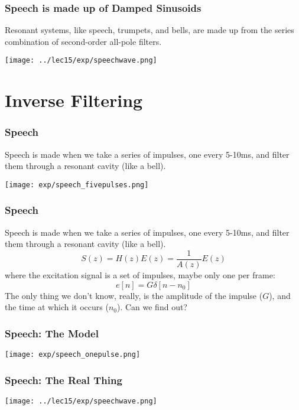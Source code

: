 \documentclass{beamer}
\begin{document}
\begin{frame}
  \frametitle{Speech is made up of Damped Sinusoids}

  Resonant systems, like speech, trumpets, and bells, are made up from
  the series combination of second-order all-pole filters.

  \centerline{\texttt{[image: ../lec15/exp/speechwave.png]}}
\end{frame}


\section[Second-Order]{Inverse Filtering}
\setcounter{subsection}{1}

\begin{frame}
  \frametitle{Speech}

  Speech is made when we take a series of impulses, one every 5-10ms,
  and filter them through a resonant cavity (like a bell).

  \centerline{\texttt{[image: exp/speech\_fivepulses.png]}}
\end{frame}

\begin{frame}
  \frametitle{Speech}

  Speech is made when we take a series of impulses, one every 5-10ms,
  and filter them through a resonant cavity (like a bell).
  \begin{displaymath}
    S(z) = H(z) E(z) = \frac{1}{A(z)} E(z)
  \end{displaymath}
  where the excitation signal is a set of impulses, maybe only one per frame:
  \begin{displaymath}
    e[n] = G\delta[n-n_0]
  \end{displaymath}
  The only thing we don't know, really, is the amplitude of the
  impulse ($G$), and the time at which it occurs ($n_0$).  Can we find out?
\end{frame}

\begin{frame}
  \frametitle{Speech: The Model}

  \centerline{\texttt{[image: exp/speech\_onepulse.png]}}
\end{frame}

\begin{frame}
  \frametitle{Speech: The Real Thing}

  \centerline{\texttt{[image: ../lec15/exp/speechwave.png]}}
\end{frame}
\end{document}
